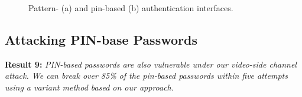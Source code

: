         \begin{figure}[!t]
            \centering
            \hspace{0.2cm}
            \caption{Pattern- (a) and pin-based (b) authentication interfaces.}
            \label{fig:unlock interface}
        \end{figure}

    \subsection{Attacking PIN-base Passwords}
    \label{section: attacking-pin-passwords}
        \noindent \textbf{Result 9:} \emph{PIN-based passwords are also
        vulnerable under our video-side channel attack. We can break
        over 85\% of the pin-based passwords within five attempts using a
        variant method based on our approach.}

